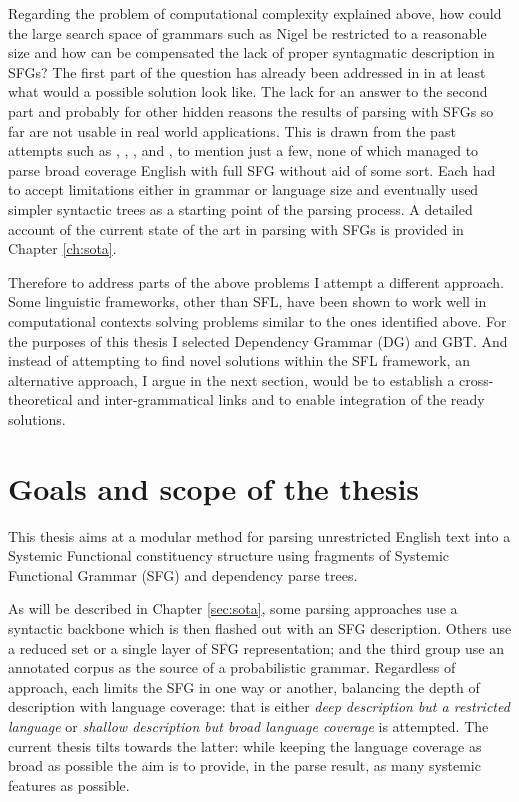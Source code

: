 Regarding the problem of computational complexity explained above, how could the large search space of grammars such as Nigel be restricted to a reasonable size and how can be compensated the lack of proper syntagmatic description in SFGs? The first part of the question has already been addressed in \citet{ODonnell1993} in at least what would a possible solution look like. The lack for an answer to the second part and probably for other hidden reasons the results of parsing with SFGs so far are not usable in real world applications. This is drawn from the past attempts such as \citet{Kasper1988}, \citet{Kay1985}, \citet{ODonoghue1991a}, \citet{ODonnell1993} and \citet{Day2007}, to mention just a few, none of which managed to parse broad coverage English with full SFG without aid of some sort. Each had to accept limitations either in grammar or language size and eventually used simpler syntactic trees as a starting point of the parsing process. A detailed account of the current state of the art in parsing with SFGs is provided in Chapter \ref{ch:sota}. 

Therefore to address parts of the above problems I attempt a different approach. %
Some linguistic frameworks, other than SFL, have been shown to work well in computational contexts solving problems similar to the ones identified above. For the purposes of this thesis I selected Dependency Grammar (DG) and GBT. And instead of attempting to find novel solutions within the SFL framework, an alternative approach, I argue in the next section, would be to establish a cross-theoretical and inter-grammatical links and to enable integration of the ready solutions. 


\section{Goals and scope of the thesis}
\label{sec:solution}

This thesis aims at a modular method for parsing unrestricted English text into a Systemic Functional constituency structure using fragments of Systemic Functional Grammar (SFG) and dependency parse trees.

As will be described in Chapter \ref{sec:sota}, some parsing approaches use a syntactic backbone which is then flashed out with an SFG description. Others use a reduced set or a single layer of SFG representation; and the third group use an annotated corpus as the source of a probabilistic grammar. Regardless of approach, each limits the SFG in one way or another, balancing the depth of description with language coverage: that is either \textit{deep description but a restricted language} or \textit{shallow description but broad language coverage} is attempted. The current thesis tilts towards the latter: while keeping the language coverage as broad as possible the aim is to provide, in the parse result, as many systemic features as possible.

